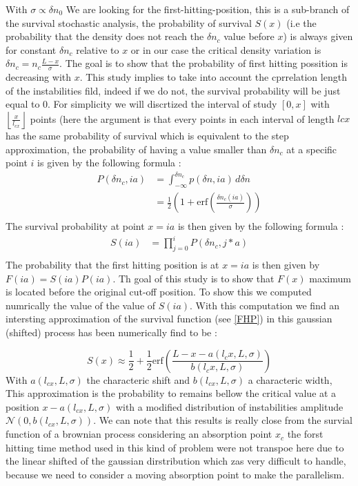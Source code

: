 \documentclass[11pt,a4paper,openany]{report}
\begin{document}
\begin{multicols}{2}
    With $\sigma \propto \delta n_0$ We are looking for the first-hitting-position, this is a sub-branch of the survival stochastic analysis, the probability of survival $S(x)$ (i.e the probability that the density does not reach the $\delta n_c$ value before $x$) is always given for constant $\delta n_c$ relative to $x$ or in our case the critical density variation is $\delta n_c = n_c\frac{L-x}{\sigma}$. The goal is to show that the probability of first hitting possition is decreasing with $x$. This study implies to take into account the cprrelation length of the instabilities fild, indeed if we do not, the survival probability will be just equal to 0. For simplicity we will discrtized the interval of study $[0,x]$  with $\left\lfloor \frac{x}{l_{cx}} \right\rfloor $ points (here the argument is that every points in each interval of length $lcx$ has the same probability of survival which is equivalent to  the step approximation, the probability of having a value smaller than $\delta n_c$ at a specific point $i$ is given by the following formula :
    \begin{align*}
        P(\delta n_c, ia) & = \int_{-\infty}^{\delta n_c} p(\delta n, ia) \, d\delta n                         \\
                          & = \frac{1}{2}\left(1 + \text{erf}\left(\frac{\delta n_c(ia)}{\sigma}\right)\right) \\
    \end{align*}
    The survival probability at point  $x = ia$ is then given by the following formula :
    \begin{align*}
        S(ia) & = \prod_{j=0}^{i} P(\delta n_c, j*a) \\
    \end{align*}
    The probability that the first hitting position is at $x = ia$ is then given by $F(ia) = S(ia)P(ia)$. Th goal of this study is to show that $F(x)$ maximum is located before the original cut-off position. To show this we computed numrically the value of the value of $S(ia)$. With this computation we find an intersting approximation of the survival function (see \ref{FHP}) in this gaussian (shifted) process has been numerically find
    to be :

    \begin{equation}\label{survival}
        S(x) \approx \frac{1}{2} + \frac{1}{2}\text{erf}\left(\frac{L - x- a(l_cx, L, \sigma)}{b(l_cx, L, \sigma)} \right)
    \end{equation}
    With $a(l_{cx}, L, \sigma)$ the characteric shift and $b(l_{cx}, L, \sigma)$  a characteric width, This approximation is the probability to remains bellow the critical value at a position $x - a(l_{cx}, L, \sigma)$ with a modified distribution of instabilities amplitude $\mathcal{N}(0,b(l_{cx}, L, \sigma))$. We can note that this results is really close from the survial function of a brownian process considering an absorption point $x_c$ the forst hitting time method used in this kind of problem were not transpoe here due to the linear shifted of the gaussian dirstribution which zas very difficult to handle, because we need to consider a moving absorption point to make the parallelism.


\end{multicols}
\end{document}
